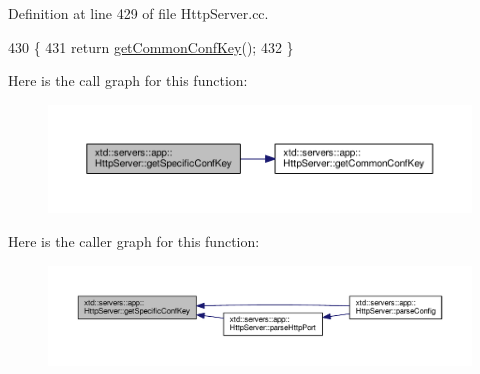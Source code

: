 Definition at line 429 of file Http\+Server.\+cc.


\begin{DoxyCode}
430 \{
431   \textcolor{keywordflow}{return} \hyperlink{classxtd_1_1servers_1_1app_1_1HttpServer_a3c838a2599ff485454ca19790ae0529c}{getCommonConfKey}();
432 \}
\end{DoxyCode}


Here is the call graph for this function\+:
\nopagebreak
\begin{figure}[H]
\begin{center}
\leavevmode
\includegraphics[width=350pt]{classxtd_1_1servers_1_1app_1_1HttpServer_a2b8fdc59d125cae41a833da5daf16d97_cgraph}
\end{center}
\end{figure}




Here is the caller graph for this function\+:
\nopagebreak
\begin{figure}[H]
\begin{center}
\leavevmode
\includegraphics[width=350pt]{classxtd_1_1servers_1_1app_1_1HttpServer_a2b8fdc59d125cae41a833da5daf16d97_icgraph}
\end{center}
\end{figure}


